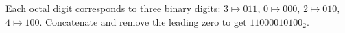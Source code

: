 Each octal digit corresponds to three binary digits: $3\mapsto011$, $0\mapsto000$, $2\mapsto010$, $4\mapsto100$. Concatenate and remove the leading zero to get $\boxed{11000010100_2}$.
